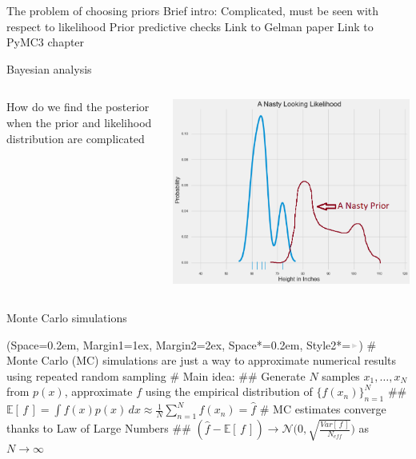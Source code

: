 \documentclass[12pt, aspectratio=149]{beamer}
\newcommand{\listSpace}{0.2em}
\theoremstyle{plain}
\begin{document}
\begin{frame}[fragile]{The problem of choosing priors}
	Brief intro: Complicated, must be seen with respect to likelihood
	Prior predictive checks
	Link to Gelman paper
	Link to PyMC3 chapter
\end{frame}

\begin{frame}{Bayesian analysis}
\begin{columns}
\begin{column}{0.5\linewidth}
How do we find the posterior when the prior and likelihood distribution are complicated
\end{column}
\begin{column}{0.5\linewidth}
\includegraphics[scale=0.2]{figs/nasty_prior_posterior_example.png}
\end{column}
\end{columns}
\end{frame}

\begin{frame}[fragile]{Monte Carlo simulations}
	\begin{easylist}
		\ListProperties(Space=\listSpace, Margin1=1ex, Margin2=2ex, Space*=\listSpace, Style2*=$\color{bggraydark}\blacktriangleright$\space)
		# Monte Carlo (MC) simulations are just a way to approximate numerical results using repeated random sampling
		# Main idea:
		## Generate $N$ samples $x_1, \ldots, x_N$ from $p(x)$, approximate $f$ using the empirical distribution of $\{f(x_n)\}_{n=1}^N$
		## $\mathbb{E}\left[ \, f \, \right] = \int f(x)p(x) \,dx \approx \frac{1}{N} \sum_{n=1}^{N} f(x_n) = \hat{f}$ 
		# MC estimates converge thanks to Law of Large Numbers
		## $(\hat{f} - \mathbb{E}\left[ \, f \, \right]) \rightarrow \mathcal{N}\Big(0, \sqrt{\frac{Var\left[\,f\,\right]}{N_{eff}}}\Big)$ as $N \rightarrow \infty$
	\end{easylist}
\end{frame}
\end{document}
